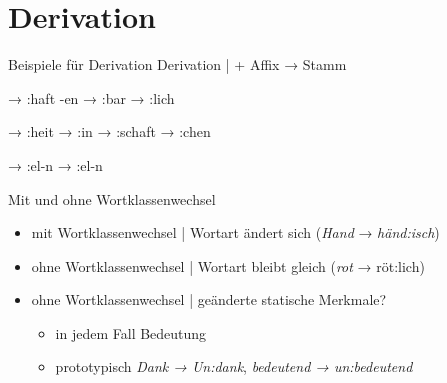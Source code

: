\section{Derivation}

\begin{frame}
  {Beispiele für Derivation}
  \pause
  Derivation |  + \alert{Affix} → Stamm
  \Halbzeile
  \pause
  \begin{exe}
    \ex
    \begin{xlist}
      \ex {} → \alert{:haft}
      \pause
      \ex {}-en → \alert{:bar}
      \pause
      \ex {} → \alert{:lich}
    \end{xlist}
    \pause
    \Halbzeile
    \ex
    \begin{xlist}
      \ex {} → \alert{:heit}
      \pause
      \ex {} → \alert{:in}
      \pause
      \ex {} → \alert{:schaft}
      \pause
      \ex {} → \alert{:chen}
    \end{xlist}
    \pause
    \Halbzeile
    \ex
    \begin{xlist}
      \ex {} → \alert{:el}-n
      \pause
      \ex {} → \alert{:el}-n
    \end{xlist}
  \end{exe}
\end{frame}

\begin{frame}
  {Mit und ohne Wortklassenwechsel}
  \pause
  \begin{itemize}[<+->]
    \item \alert{mit} Wortklassenwechsel | Wortart ändert sich (\textit{Hand} → \textit{händ:isch})
    \item \alert{ohne} Wortklassenwechsel | Wortart bleibt gleich (\textit{rot} → röt:lich)
      \Zeile
    \item ohne Wortklassenwechsel | geänderte statische Merkmale?
      \begin{itemize}[<+->]
        \item in jedem Fall \alert{Bedeutung}
        \item prototypisch \textit{Dank → Un:dank}, \textit{bedeutend → un:bedeutend}
      \end{itemize}
  \end{itemize}
\end{frame}


